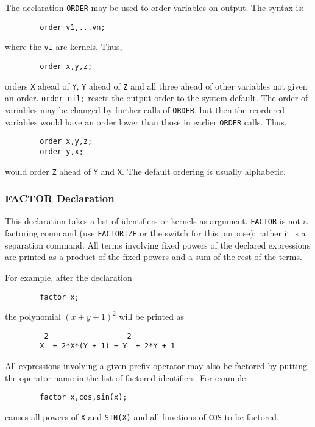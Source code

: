 The declaration \texttt{ORDER} may be used to order variables
on output.  The syntax is:
\begin{verbatim}
        order v1,...vn;
\end{verbatim}
where the \texttt{vi} are kernels.  Thus,
\begin{verbatim}
        order x,y,z;
\end{verbatim}
orders \texttt{X} ahead of \texttt{Y}, \texttt{Y} ahead of \texttt{Z} and all three
ahead of other variables not given an order. \texttt{order nil;} resets the
output order to the system default.  The order of variables may be changed
by further calls of \texttt{ORDER}, but then the reordered variables would
have an order lower than those in earlier \texttt{ORDER} calls.
Thus,
\begin{verbatim}
        order x,y,z;
        order y,x;
\end{verbatim}
would order \texttt{Z} ahead of \texttt{Y} and \texttt{X}.  The default ordering is
usually alphabetic.

\subsubsection{FACTOR Declaration}
\hypertarget{command:FACTOR}{}

This declaration takes a list of identifiers or kernels
as argument. \texttt{FACTOR} is not a factoring command
(use \texttt{FACTORIZE} or the  switch for this purpose); rather it
is a separation command.  All terms involving fixed powers of the declared
expressions are printed as a product of the fixed powers and a sum of the
rest of the terms.

For example, after the declaration
\begin{verbatim}
        factor x;
\end{verbatim}
the polynomial $(x+y+1)^{2}$ will be printed as
\begin{verbatim}
         2                  2
        X  + 2*X*(Y + 1) + Y  + 2*Y + 1
\end{verbatim}
All expressions involving a given prefix operator may also be factored by
putting the operator name in the list of factored identifiers. For example:
\begin{verbatim}
        factor x,cos,sin(x);
\end{verbatim}
causes all powers of \texttt{X} and \texttt{SIN(X)} and all functions of
\texttt{COS} to be factored.

